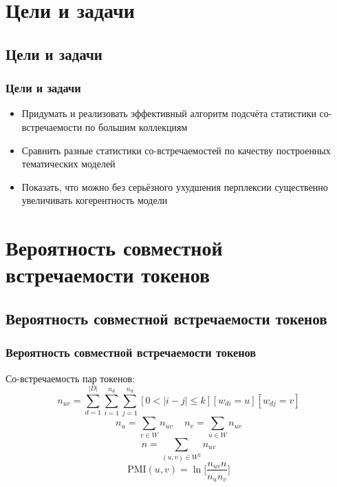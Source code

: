\documentclass[unicode]{beamer}
\begin{document}
\section{Цели и задачи}

\subsection{Цели и задачи}
\begin{frame}
\frametitle{Цели и задачи}
\begin{itemize}
    \item Придумать и реализовать эффективный алгоритм подсчёта статистики со-встречаемости по большим коллекциям \newline
    \item Сравнить разные статистики со-встречаемостей по качеству построенных тематических моделей \newline
    \item Показать, что можно без серьёзного ухудшения перплексии \newline существенно увеличивать когерентность модели
\end{itemize}
\end{frame}

\section{Вероятность совместной встречаемости токенов}

\subsection{Вероятность совместной встречаемости токенов}
\begin{frame}
\frametitle{Вероятность совместной встречаемости токенов}
Со-встречаемость пар токенов:
$$n_{uv} = \sum_{d = 1}^{|D|} \sum_{i = 1}^{n_d} \sum_{j = 1}^{n_d}
		[0 < |i - j| \leq k] [w_{di} = u] [w_{dj} = v] $$
$$n_{u} = \sum_{v \in W} n_{uv} \,\,\,\,\,\,\,
n_{v} = \sum_{u \in W} n_{uv}$$
$$n = \sum_{(u, v) \in W^2} n_{uv}$$
$$\text{PMI}(u, v) = \ln \Big[ \frac{n_{uv} n}{n_u n_v} \Big]$$    
\end{frame}
\end{document}
